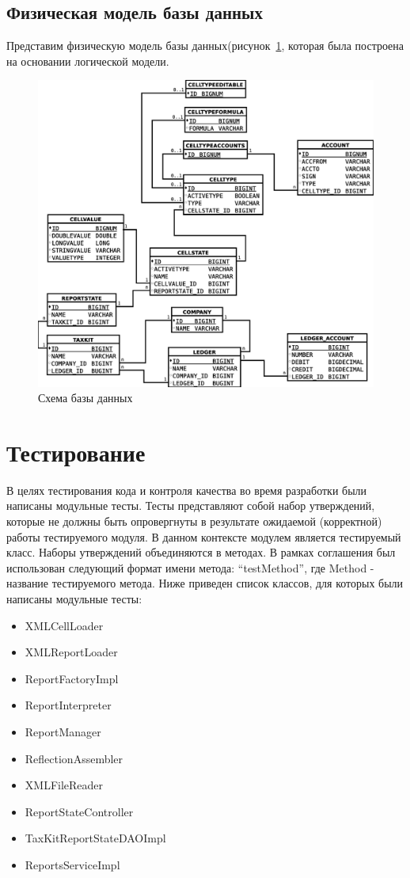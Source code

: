 \documentclass[14pt,a4paper]{reportmod}
\begin{document}
\subsection{Физическая модель базы данных}
Представим физическую модель базы данных(рисунок~\ref{pic:database}, которая была построена на основании логической модели.
\begin{figure}
  \centering
  \includegraphics[scale=0.4]{uml/database}
  \caption{Схема базы данных}
  \label{pic:database}
\end{figure}

\section{Тестирование}
В целях тестирования кода и контроля качества во время разработки были написаны модульные тесты. Тесты представляют собой набор утверждений, которые не должны быть опровергнуты в результате ожидаемой (корректной) работы тестируемого модуля. В данном контексте модулем является тестируемый класс. Наборы утверждений объединяются в методах. В рамках соглашения был использован следующий формат имени метода: ``testMethod'', где Method - название тестируемого метода.
Ниже приведен список классов, для которых были написаны модульные тесты:
\begin{itemize}
  \item XMLCellLoader
  \item XMLReportLoader
  \item ReportFactoryImpl
  \item ReportInterpreter
  \item ReportManager
  \item ReflectionAssembler
  \item XMLFileReader
  \item ReportStateController
  \item TaxKitReportStateDAOImpl
  \item ReportsServiceImpl
\end{itemize}
\end{document}
